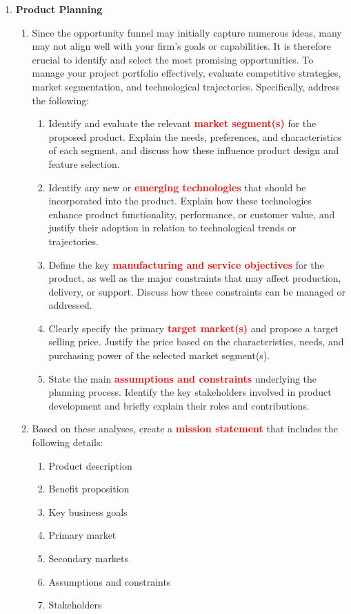\begin{enumerate}
    \item \textbf{Product Planning}
    \begin{enumerate}
        \item Since the opportunity funnel may initially capture numerous ideas, many may not align well with your firm's goals or capabilities. It is therefore crucial to identify and select the most promising opportunities. To manage your project portfolio effectively, evaluate competitive strategies, market segmentation, and technological trajectories. Specifically, address the following:
        \begin{enumerate}
            \item Identify and evaluate the relevant \textbf{\textcolor{red}{market segment(s)}} for the proposed product. Explain the needs, preferences, and characteristics of each segment, and discuss how these influence product design and feature selection.
            \item Identify any new or \textbf{\textcolor{red}{emerging technologies}} that should be incorporated into the product. Explain how these technologies enhance product functionality, performance, or customer value, and justify their adoption in relation to technological trends or trajectories.
            \item Define the key \textbf{\textcolor{red}{manufacturing and service objectives}} for the product, as well as the major constraints that may affect production, delivery, or support. Discuss how these constraints can be managed or addressed.
            \item Clearly specify the primary \textbf{\textcolor{red}{target market(s)}} and propose a target selling price. Justify the price based on the characteristics, needs, and purchasing power of the selected market segment(s).
            \item State the main \textbf{\textcolor{red}{assumptions and constraints}} underlying the planning process. Identify the key stakeholders involved in product development and briefly explain their roles and contributions.
        \end{enumerate}


        \item Based on these analyses, create a \textbf{\textcolor{red}{mission statement}} that includes the following details:
        \begin{enumerate}
            \item Product description
            \item Benefit proposition
            \item Key business goals
            \item Primary market
            \item Secondary markets
            \item Assumptions and constraints
            \item Stakeholders
        \end{enumerate}
    \end{enumerate}


\end{enumerate}
